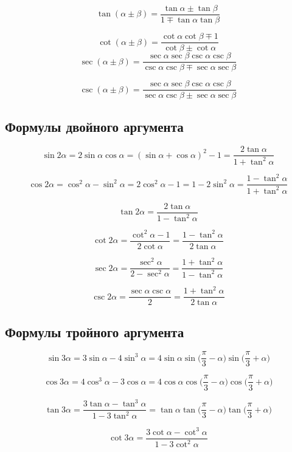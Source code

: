 \documentclass[
  letterpaper,
  DIV=11,
  numbers=noendperiod]{scrreprt}
\theoremstyle{definition}
\theoremstyle{remark}
\begin{document}
\[
\tan (\alpha \pm \beta) = \frac{\tan \alpha \pm \tan \beta}{1 \mp \tan \alpha \tan \beta}
\]

\[
\cot (\alpha \pm \beta) = \frac{\cot \alpha \cot \beta \mp 1}{\cot \beta \pm \cot \alpha}
\] \[
\sec (\alpha \pm \beta) = \frac{\sec \alpha \sec \beta \csc \alpha \csc \beta}{\csc \alpha \csc \beta \mp \sec \alpha \sec \beta}
\]

\[
\csc (\alpha \pm \beta) = \frac{\sec \alpha \sec \beta \csc \alpha \csc \beta}{\sec \alpha \csc \beta \pm \sec \alpha \sec \beta}
\]

\subsection{Формулы двойного аргумента}\label{trig_double_arg}

\[
\sin 2\alpha = 2\sin \alpha \cos \alpha = (\sin \alpha + \cos \alpha)^2 -1 = \frac{2\tan \alpha}{1 + \tan^2 \alpha}
\]

\[
\cos 2\alpha = \cos^2 \alpha - \sin^2 \alpha = 2\cos^2 \alpha - 1 = 1 - 2\sin^2 \alpha = \frac{1 - \tan^2 \alpha}{1 + \tan^2 \alpha}
\]

\[
\tan 2\alpha = \frac{2\tan \alpha}{1 - \tan^2 \alpha}
\]

\[
\cot 2\alpha = \frac{\cot^2 \alpha - 1}{2 \cot \alpha} = \frac{1 - \tan^2 \alpha}{2 \tan \alpha}
\]

\[
\sec 2\alpha = \frac{\sec^2 \alpha}{2 - \sec^2 \alpha} = \frac{1 + \tan^2 \alpha}{1 - \tan^2 \alpha}
\]

\[
\csc 2\alpha = \frac{\sec \alpha \csc \alpha}{2} = \frac{1 + \tan^2 \alpha}{2 \tan \alpha}
\]

\subsection{Формулы тройного аргумента}\label{trig_triple_arg}

\[
\sin 3\alpha = 3\sin \alpha - 4 \sin^3 \alpha = 4\sin \alpha \sin \Big( \frac{\pi}{3} - \alpha\Big) \sin \Big( \frac{\pi}{3} + \alpha \Big)
\]

\[
\cos 3\alpha = 4\cos^3 \alpha - 3 \cos \alpha = 4\cos \alpha \cos \Big(\frac{\pi}{3} - \alpha\Big) \cos \Big(\frac{\pi}{3} + \alpha\Big)
\]

\[
\tan 3\alpha = \frac{3\tan \alpha - \tan^3 \alpha}{1 - 3\tan^2 \alpha} = \tan \alpha \tan \Big( \frac{\pi}{3} - \alpha \Big) \tan \Big(\frac{\pi}{3} + \alpha \Big)
\]

\[
\cot 3\alpha = \frac{3 \cot \alpha - \cot^3 \alpha}{1 - 3\cot^2 \alpha}
\]
\end{document}
